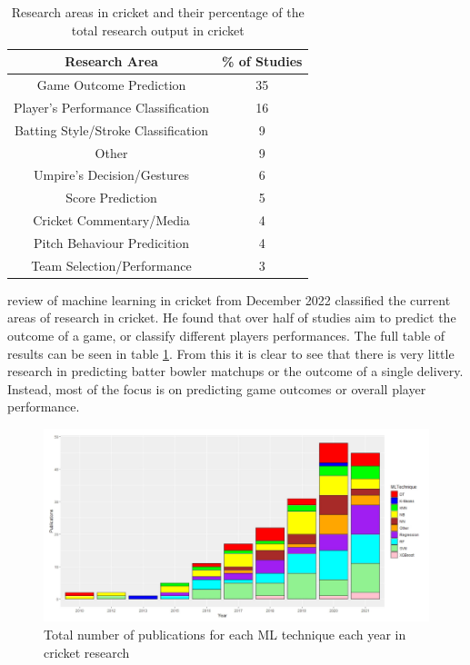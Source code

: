 \documentclass[12pt,a4paper]{report}
\theoremstyle{definition}
\begin{document}
\begin{table}[H] \label{tab:ResearchCrick}
	\centering
	\caption{Research areas in cricket and their percentage of the total research output in cricket \citep{Wickramasinghe2022}}
	\begin{tabular}{||c c ||} 
		\hline
		Research Area & \% of Studies \\ [0.5ex] 
		\hline\hline
		Game Outcome Prediction & 35 \\ 
		\hline
		Player's Performance Classification & 16 \\
		\hline
		Batting Style/Stroke Classification & 9 \\
		\hline
		Other & 9 \\
		\hline
		Umpire's Decision/Gestures & 6 \\
		\hline
		Score Prediction & 5 \\
		\hline
		Cricket Commentary/Media & 4 \\
		\hline
		Pitch Behaviour Predicition & 4 \\
		\hline
		Team Selection/Performance & 3 \\ [1ex] 
	\hline
	\end{tabular}
\end{table}

\citet{Wickramasinghe2022} review of machine learning in cricket from December 2022 classified the current areas of research in cricket. 
He found that over half of studies aim to predict the outcome of a game, or classify different players performances. 
The full table of results can be seen in table \ref{tab:ResearchCrick}. 
From this it is clear to see that there is very little research in predicting batter bowler matchups or the outcome of a single delivery. 
Instead, most of the focus is on predicting game outcomes or overall player performance.

\begin{figure}[H]
    \centering
    \includegraphics[width=\linewidth]{ML_techniques_cricket.png}
    \caption{Total number of publications for each ML technique each year in cricket research \citep{Wickramasinghe2022}}
    \label{fig:NoPapersCricket}
\end{figure}
\end{document}
